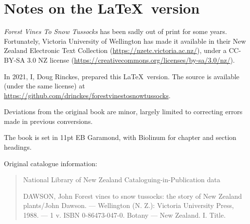 \chapter{Notes on the \LaTeX\ version}

\emph{Forest Vines To Snow Tussocks} has been sadly out of print for some years.
Fortunately, Victoria University of Wellington has made it available in their New Zealand Electronic Text Collection (\url{https://nzetc.victoria.ac.nz/}), under a CC-BY-SA 3.0 NZ license (\url{https://creativecommons.org/licenses/by-sa/3.0/nz/}).

In 2021, I, Doug Rinckes, prepared this \LaTeX\ version. The source is available (under the same license) at \url{https://github.com/drinckes/forestvinestosnowtussocks}.

Deviations from the original book are minor, largely limited to correcting errors made in previous conversions.

The book is set in 11pt EB Garamond, with Biolinum for chapter and section headings.

Original catalogue information:

\begin{quote}
	National Library of New Zealand\newline
	Cataloguing-in-Publication data

	DAWSON, John\newline
	Forest vines to snow tussocks: the story of New Zealand plants/John Dawson. --- Wellington (N. Z.): Victoria University Press, 1988. --- 1 v.\newline
	ISBN 0-86473-047-0. Botany --- New Zealand. I. Title.\newline
\end{quote}
